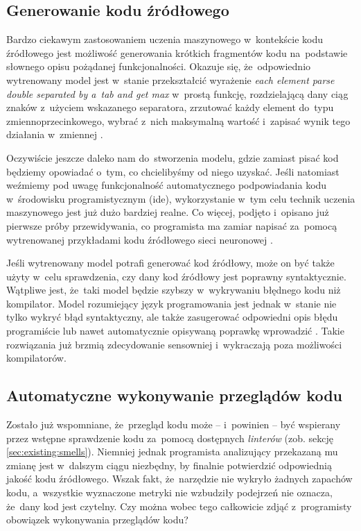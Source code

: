 \documentclass[twoside]{praca}
\begin{document}
\subsection{Generowanie kodu źródłowego}

Bardzo ciekawym zastosowaniem uczenia maszynowego w~kontekście kodu źródłowego jest możliwość generowania krótkich fragmentów kodu na~podstawie słownego opisu pożądanej funkcjonalności. Okazuje się, że~odpowiednio wytrenowany model jest w~stanie przekształcić wyrażenie \textit{each element parse double separated by a~tab and get max} w~prostą funkcję, rozdzielającą dany ciąg znaków z~użyciem wskazanego separatora, zrzutować każdy element do~typu zmiennoprzecinkowego, wybrać z~nich maksymalną wartość i~zapisać wynik tego działania w~zmiennej \cite{allamanis2015bimodal}.

Oczywiście jeszcze daleko nam do~stworzenia modelu, gdzie zamiast pisać kod będziemy opowiadać o~tym, co chcielibyśmy od niego uzyskać. Jeśli natomiast weźmiemy pod uwagę funkcjonalność automatycznego podpowiadania kodu w~środowisku programistycznym (\gls{ide}), wykorzystanie w~tym celu technik uczenia maszynowego jest już dużo bardziej realne. Co więcej, podjęto i~opisano już pierwsze próby przewidywania, co programista ma zamiar napisać za~pomocą wytrenowanej przykładami kodu źródłowego sieci neuronowej \cite{tarlow2018source}.

Jeśli wytrenowany model potrafi generować kod źródłowy, może on być także użyty w~celu sprawdzenia, czy dany kod źródłowy jest poprawny syntaktycznie. Wątpliwe jest, że~taki model będzie szybszy w~wykrywaniu błędnego kodu niż kompilator. Model rozumiejący język programowania jest jednak w~stanie nie tylko wykryć błąd syntaktyczny, ale także zasugerować odpowiedni opis błędu programiście \cite{campbell2014syntax} lub nawet automatycznie opisywaną poprawkę wprowadzić \cite{bhatia2016automated}. Takie rozwiązania już brzmią zdecydowanie sensowniej i~wykraczają poza możliwości kompilatorów.

\subsection{Automatyczne wykonywanie przeglądów kodu}

Zostało już wspomniane, że~przegląd kodu może -- i~powinien -- być wspierany przez wstępne sprawdzenie kodu za~pomocą dostępnych \textit{linterów} (zob. sekcję \ref{sec:existing:smells}). Niemniej jednak programista analizujący przekazaną mu zmianę jest w~dalszym ciągu niezbędny, by finalnie potwierdzić odpowiednią jakość kodu źródłowego. Wszak fakt, że~narzędzie nie wykryło żadnych zapachów kodu, a~wszystkie wyznaczone metryki nie wzbudziły podejrzeń nie oznacza, że~dany kod jest czytelny. Czy można wobec tego całkowicie zdjąć z~programisty obowiązek wykonywania przeglądów kodu?
\end{document}
